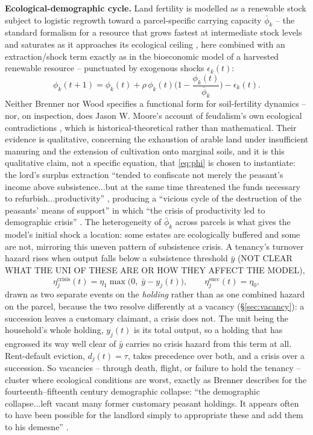 \documentclass[11pt,english]{article}
\begin{document}
\textbf{Ecological-demographic cycle.} Land fertility is modelled as a renewable stock subject to logistic regrowth toward a parcel-specific carrying capacity $\bar\phi_k$ -- the standard formalism for a resource that grows fastest at intermediate stock levels and saturates as it approaches its ecological ceiling \cite{verhulst1838notice}, here combined with an extraction/shock term exactly as in the bioeconomic model of a harvested renewable resource \cite{schaefer1954some} -- punctuated by exogenous shocks $\epsilon_k(t)$:
\begin{equation}
\phi_k(t+1) = \phi_k(t) + \rho\,\phi_k(t)\Big(1-\frac{\phi_k(t)}{\bar\phi_k}\Big) - \epsilon_k(t).
\label{eq:phi}
\end{equation}
Neither Brenner nor Wood specifies a functional form for soil-fertility dynamics -- nor, on inspection, does Jason W. Moore's account of feudalism's own ecological contradictions \cite{moore2003nature}, which is historical-theoretical rather than mathematical. Their evidence is qualitative, concerning the exhaustion of arable land under insufficient manuring and the extension of cultivation onto marginal soils, and it is this qualitative claim, not a specific equation, that \eqref{eq:phi} is chosen to instantiate: the lord's surplus extraction ``tended to confiscate not merely the peasant's income above subsistence...but at the same time threatened the funds necessary to refurbish...productivity'' \cite[p.48]{brenner1976agrarian}, producing a ``vicious cycle of the destruction of the peasants' means of support'' in which ``the crisis of productivity led to demographic crisis'' \cite[p.49-50]{brenner1976agrarian}. The heterogeneity of $\bar\phi_k$ across parcels is what gives the model's initial shock a location: some estates are ecologically buffered and some are not, mirroring this uneven pattern of subsistence crisis. A tenancy's turnover hazard rises when output falls below a subsistence threshold $\bar y$ (NOT CLEAR WHAT THE UNI OF THESE ARE OR HOW THEY AFFECT THE MODEL),
\begin{equation}
\eta_j^{\text{crisis}}(t) = \eta_1 \max\!\big(0,\; \bar y - y_j(t)\big), \qquad
\eta_j^{\text{succ}}(t) = \eta_0,
\label{eq:eta}
\end{equation}
drawn as two separate events on the \emph{holding} rather than as one combined hazard on the parcel, because the two resolve differently at a vacancy (\S\ref{sec:vacancy}): a succession leaves a customary claimant, a crisis does not. The unit being the household's whole holding, $y_j(t)$ is its total output, so a holding that has engrossed its way well clear of $\bar y$ carries no crisis hazard from this term at all. Rent-default eviction, $d_j(t)=\tau$, takes precedence over both, and a crisis over a succession. So vacancies -- through death, flight, or failure to hold the tenancy -- cluster where ecological conditions are worst, exactly as Brenner describes for the fourteenth--fifteenth century demographic collapse: ``the demographic collapse...left vacant many former customary peasant holdings. It appears often to have been possible for the landlord simply to appropriate these and add them to his demesne'' \cite[p.61]{brenner1976agrarian}.
\end{document}
